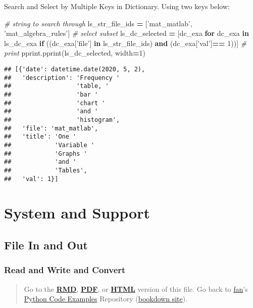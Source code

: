 \documentclass[
]{book}
\newenvironment{Shaded}{\begin{snugshade}}{\end{snugshade}}
\newcommand{\CommentTok}[1]{\textcolor[rgb]{0.56,0.35,0.01}{\textit{#1}}}
\newcommand{\ControlFlowTok}[1]{\textcolor[rgb]{0.13,0.29,0.53}{\textbf{#1}}}
\newcommand{\DecValTok}[1]{\textcolor[rgb]{0.00,0.00,0.81}{#1}}
\newcommand{\KeywordTok}[1]{\textcolor[rgb]{0.13,0.29,0.53}{\textbf{#1}}}
\newcommand{\NormalTok}[1]{#1}
\newcommand{\OperatorTok}[1]{\textcolor[rgb]{0.81,0.36,0.00}{\textbf{#1}}}
\newcommand{\StringTok}[1]{\textcolor[rgb]{0.31,0.60,0.02}{#1}}
\begin{document}
Search and Select by Multiple Keys in Dictionary. Using two keys below:

\begin{Shaded}
\begin{Highlighting}[]
\CommentTok{# string to search through}
\NormalTok{ls_str_file_ids }\OperatorTok{=}\NormalTok{ [}\StringTok{'mat_matlab'}\NormalTok{, }\StringTok{'mat_algebra_rules'}\NormalTok{]}
\CommentTok{# select subset}
\NormalTok{ls_dc_selected }\OperatorTok{=}\NormalTok{ [dc_exa}
                  \ControlFlowTok{for}\NormalTok{ dc_exa }\KeywordTok{in}\NormalTok{ ls_dc_exa}
                  \ControlFlowTok{if}\NormalTok{ ((dc_exa[}\StringTok{'file'}\NormalTok{] }\KeywordTok{in}\NormalTok{ ls_str_file_ids) }
                      \KeywordTok{and}
\NormalTok{                      (dc_exa[}\StringTok{'val'}\NormalTok{]}\OperatorTok{==} \DecValTok{1}\NormalTok{))]}
\CommentTok{# print}
\NormalTok{pprint.pprint(ls_dc_selected, width}\OperatorTok{=}\DecValTok{1}\NormalTok{)}
\end{Highlighting}
\end{Shaded}

\begin{verbatim}
## [{'date': datetime.date(2020, 5, 2),
##   'description': 'Frequency '
##                  'table, '
##                  'bar '
##                  'chart '
##                  'and '
##                  'histogram',
##   'file': 'mat_matlab',
##   'title': 'One '
##            'Variable '
##            'Graphs '
##            'and '
##            'Tables',
##   'val': 1}]
\end{verbatim}

\hypertarget{system-and-support}{%
\chapter{System and Support}\label{system-and-support}}

\hypertarget{file-in-and-out}{%
\section{File In and Out}\label{file-in-and-out}}

\hypertarget{read-and-write-and-convert}{%
\subsection{Read and Write and Convert}\label{read-and-write-and-convert}}

\begin{quote}
Go to the \href{https://github.com/FanWangEcon//pyfan/blob/master/.//A-Collection-of-Python-Examples.Rmd}{\textbf{RMD}}, \href{https://github.com/FanWangEcon//pyfan/blob/master/.//htmlpdfr/A-Collection-of-Python-Examples.pdf}{\textbf{PDF}}, or \href{https://fanwangecon.github.io//pyfan/.//htmlpdfr/A-Collection-of-Python-Examples.html}{\textbf{HTML}} version of this file. Go back to \href{http://fanwangecon.github.io/}{fan}'s \href{https://fanwangecon.github.io/pyfan/}{Python Code Examples} Repository (\href{https://fanwangecon.github.io/pyfan/bookdown}{bookdown site}).
\end{quote}
\end{document}
